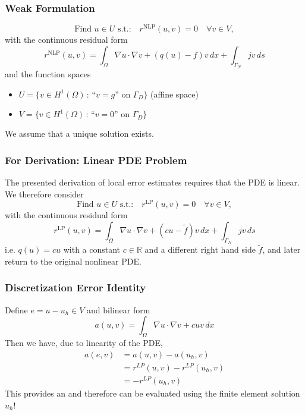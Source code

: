 \documentclass[aspectratio=169,11pt]{beamer}
\theoremstyle{definition}
\begin{document}
\begin{frame}
\frametitle{Weak Formulation}
\begin{equation*}
\text{Find $u\in U$ s.t.:} \quad r^{\text{NLP}}(u,v)=0 \quad \forall v\in V,
\end{equation*}
with the continuous residual form
\begin{equation*}
r^{\text{NLP}}(u,v) = \int_\Omega \nabla u \cdot \nabla v + (q(u)-f)v\,dx + \int_{\Gamma_N} jv\,ds
\end{equation*}
and the function spaces 
\begin{itemize}
\item $U= \{v\in H^1(\Omega) \,:\, \text{``$v=g$'' on $\Gamma_D$}\}$ (affine space)
\item $V= \{v\in H^1(\Omega) \,:\, \text{``$v=0$'' on $\Gamma_D$}\}$
\end{itemize}
We assume that a unique solution exists.
\end{frame}

\begin{frame}
\frametitle{For Derivation: Linear PDE Problem}
The presented derivation of local error estimates requires that the PDE is linear.
We therefore consider
\begin{equation*}
\text{Find $u\in U$ s.t.:} \quad r^{\text{LP}}(u,v)=0 \quad \forall v\in V,
\label{Eq:BasicBuildingBlock}
\end{equation*}
with the continuous residual form
\begin{equation*}
  r^{\text{LP}}(u,v) = \int_\Omega \nabla u \cdot \nabla v + (cu-\tilde{f})v\,dx + \int_{\Gamma_N} jv\,ds
\end{equation*}
i.e. $q(u) = c u$ with a constant $c \in \mathbb{R}$ and a different right hand
side $\tilde{f}$, and later return to the original nonlinear PDE.\@
\end{frame}

\begin{frame}
\frametitle{Discretization Error Identity}
Define  $e = u - u_h \in V$ and bilinear form
\begin{equation*}
  a(u,v) = \int_\Omega \nabla u \cdot \nabla v + c u v \,dx
\end{equation*}
Then we have, due to linearity of the PDE,
\begin{align*}
  a(e,v) &= a(u,v) - a(u_h,v) \\
  &= r^{LP}(u,v) - r^{LP}(u_h,v) \\
  &= - r^{LP}(u_h,v)
\end{align*}
  This provides an  and therefore can be
evaluated using the finite element solution $u_h$!
\end{frame}
\end{document}
